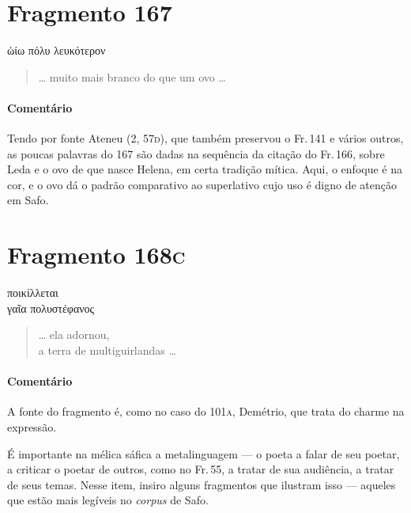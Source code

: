 \section{Fragmento 167}

\begin{gkverse}
ὠίω πόλυ λευκότερον
\end{gkverse}

\begin{verse}
\ldots{} muito mais branco do que um ovo \ldots{}
\end{verse}

\medskip

\paragraph{Comentário} Tendo por fonte Ateneu (2, 57\textsc{d}), que também preservou o Fr.\,141 e vários outros, as poucas palavras do 167 são dadas na sequência da citação do Fr.\,166, sobre Leda e o ovo de que nasce Helena, em certa tradição mítica. Aqui, o enfoque é na cor, e o ovo dá o padrão comparativo ao superlativo cujo uso é digno de atenção em Safo.

\section{Fragmento 168\textsc{c}}

\begin{gkverse}
ποικίλλεται\\
    γαῖα πολυστέφανος 
\end{gkverse}

\begin{verse}
\ldots{} ela adornou,\\
a terra de multiguirlandas \ldots{}
\end{verse}

\medskip

{\paragraph{Comentário} A fonte do fragmento é, como no caso do 101\textsc{a}, Demétrio, que trata do charme na expressão.}

\begin{argumento}
É importante na mélica sáfica a metalinguagem --- o poeta a falar de seu
poetar, a criticar o poetar de outros, como no Fr.\,55, a tratar de sua
audiência, a tratar de seus temas. Nesse item, insiro alguns fragmentos que
ilustram isso --- aqueles que estão mais legíveis no \emph{corpus} de Safo.
\end{argumento}

